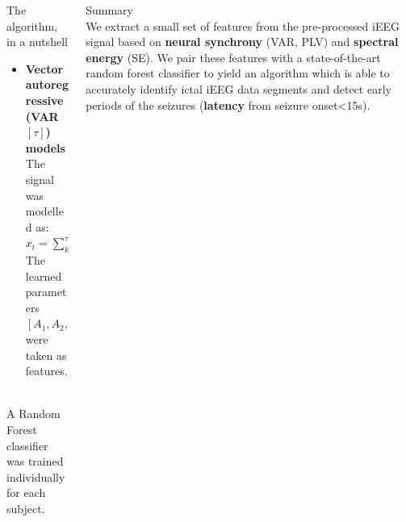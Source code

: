 \documentclass[final,t,overlay, xcolor=table, sans, mathserif]{beamer}
\begin{document}
\begin{frame}{}
\begin{columns}[t]
\begin{column}{.33\linewidth}
\begin{block}{The algorithm, in a nutshell}
\begin{minipage}[t]{0.95\linewidth}
\begin{tcolorbox}[title=2. Feature extraction]
\begin{itemize}
\item {\bf Vector autoregressive (VAR$\left[\tau\right]$) models} \\
The signal was modelled as: \\
$x_{t}=\sum_{k=1}^{\tau}A_{k}x_{t-k}+\epsilon_{t}, \epsilon\sim\mathcal{N}(0,Q)$ \\
The learned parameters $[A_{1},A_{2},...,A_{\tau},Q]$ were taken as features. \\
\qquad \\

\end{itemize}
\end{tcolorbox}
\end{minipage}


\begin{minipage}[t]{0.95\linewidth}
\begin{tcolorbox}[title=3. Clasification]
A Random Forest classifier was trained individually for each subject.
\end{tcolorbox}
\end{minipage}
\vspace{0.5cm}

\end{block}



\end{column}
\begin{column}{.27\linewidth}


\begin{block}{Summary}
\quad \\
\vspace{0.2cm}
We extract a small set of features from the pre-processed iEEG signal based on {\bf neural synchrony} (VAR, PLV) and {\bf spectral energy} (SE).
We pair these features with a state-of-the-art random forest classifier to yield an algorithm
which is able to accurately identify ictal iEEG data segments and detect early periods of the seizures
({\bf latency} from seizure onset\textless15s). \\
\quad \\
\vspace{0.3cm}
\end{block}


\end{column}
\end{columns}
\end{frame}
\end{document}
